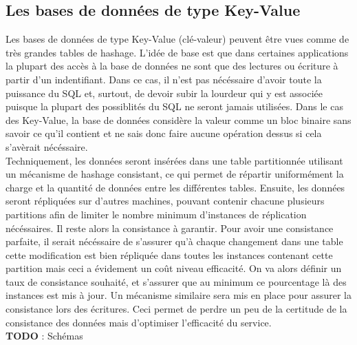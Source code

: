 \documentclass[11pt]{article}
\begin{document}
\subsection{Les bases de données de type Key-Value}
Les bases de données de type Key-Value (clé-valeur) peuvent être vues comme de très grandes tables de hashage. L'idée de base est que dans certaines applications la plupart des accès à la base de données ne sont que des lectures ou écriture à partir d'un indentifiant. Dans ce cas, il n'est pas nécéssaire d'avoir toute la puissance du SQL et, surtout, de devoir subir la lourdeur qui y est associée puisque la plupart des possiblités du SQL ne seront jamais utilisées. Dans le cas des Key-Value, la base de données considère la valeur comme un bloc binaire sans savoir ce qu'il contient et ne sais donc faire aucune opération dessus si cela s'avèrait nécéssaire. \\
Techniquement, les données seront insérées dans une table partitionnée utilisant un mécanisme de hashage consistant, ce qui permet de répartir uniformément la charge et la quantité de données entre les différentes tables. Ensuite, les données seront répliquées sur d'autres machines, pouvant contenir chacune plusieurs partitions afin de limiter le nombre minimum d'instances de réplication nécéssaires. Il reste alors la consistance à garantir. Pour avoir une consistance parfaite, il serait nécéssaire de s'assurer qu'à chaque changement dans une table cette modification est bien répliquée dans toutes les instances contenant cette partition mais ceci a évidement un coût niveau efficacité. On va alors définir un taux de consistance souhaité, et s'assurer que au minimum ce pourcentage là des instances est mis à jour. Un mécanisme similaire sera mis en place pour assurer la consistance lors des écritures. Ceci permet de perdre un peu de la certitude de la consistance des données mais d'optimiser l'efficacité du service. \\
\colorbox{BrickRed}{\textbf{TODO} : Schémas}
\end{document}
